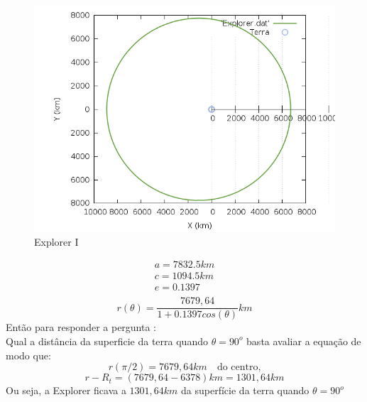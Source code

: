 \documentclass[a4paper,12pt]{exam}
\begin{document}
		\begin{figure}[h]
			\centering
			\includegraphics[scale=0.3]{5o0.png}
			\caption{Explorer I}
		\end{figure}
	\[
	\begin{array}{lll}
		a=7832.5 km \\
		c=1094.5 km \\
		e = 0.1397 \\
	\end{array}
	\]
	\[ r(\theta) = \frac{7679,64}{1+0.1397cos(\theta)} km \]
	Então para responder a pergunta :\\
	Qual a distância da superficie da terra quando $\theta = 90^o$ basta avaliar a equação de modo que:
	\[r(\pi/2) =  7679,64 km \quad \text{do centro,} \]
	\[r - R_t = (7679,64 - 6378 )km = 1301,64 km\] 
	Ou seja, a Explorer ficava a $1301,64 km$ da superfície da terra quando $\theta = 90^o$

	
\end{document}
